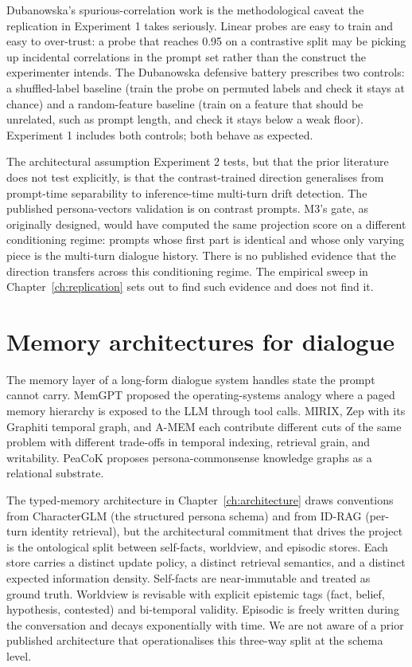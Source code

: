 Dubanowska's spurious-correlation work is the methodological caveat the replication in Experiment 1 takes seriously\autocite{dubanowska2025}. Linear probes are easy to train and easy to over-trust: a probe that reaches \auroc{} 0.95 on a contrastive split may be picking up incidental correlations in the prompt set rather than the construct the experimenter intends. The Dubanowska defensive battery prescribes two controls: a shuffled-label baseline (train the probe on permuted labels and check it stays at chance) and a random-feature baseline (train on a feature that should be unrelated, such as prompt length, and check it stays below a weak floor). Experiment 1 includes both controls; both behave as expected.

The architectural assumption Experiment 2 tests, but that the prior literature does not test explicitly, is that the contrast-trained direction generalises from prompt-time separability to inference-time multi-turn drift detection. The published persona-vectors validation is on contrast prompts. M3's gate, as originally designed, would have computed the same projection score on a different conditioning regime: prompts whose first part is identical and whose only varying piece is the multi-turn dialogue history. There is no published evidence that the direction transfers across this conditioning regime. The empirical sweep in Chapter~\ref{ch:replication} sets out to find such evidence and does not find it.

\section{Memory architectures for dialogue}

The memory layer of a long-form dialogue system handles state the prompt cannot carry. MemGPT proposed the operating-systems analogy where a paged memory hierarchy is exposed to the LLM through tool calls\autocite{memgpt2023}. MIRIX, Zep with its Graphiti temporal graph, and A-MEM each contribute different cuts of the same problem with different trade-offs in temporal indexing, retrieval grain, and writability\autocite{mirix2024, zep2024, amem2024}. PeaCoK proposes persona-commonsense knowledge graphs as a relational substrate\autocite{peacok2024}.

The typed-memory architecture in Chapter~\ref{ch:architecture} draws conventions from CharacterGLM (the structured persona schema)\autocite{characterglm2023} and from ID-RAG (per-turn identity retrieval)\autocite{idrag2024}, but the architectural commitment that drives the project is the ontological split between self-facts, worldview, and episodic stores. Each store carries a distinct update policy, a distinct retrieval semantics, and a distinct expected information density. Self-facts are near-immutable and treated as ground truth. Worldview is revisable with explicit epistemic tags (fact, belief, hypothesis, contested) and bi-temporal validity. Episodic is freely written during the conversation and decays exponentially with time. We are not aware of a prior published architecture that operationalises this three-way split at the schema level.

